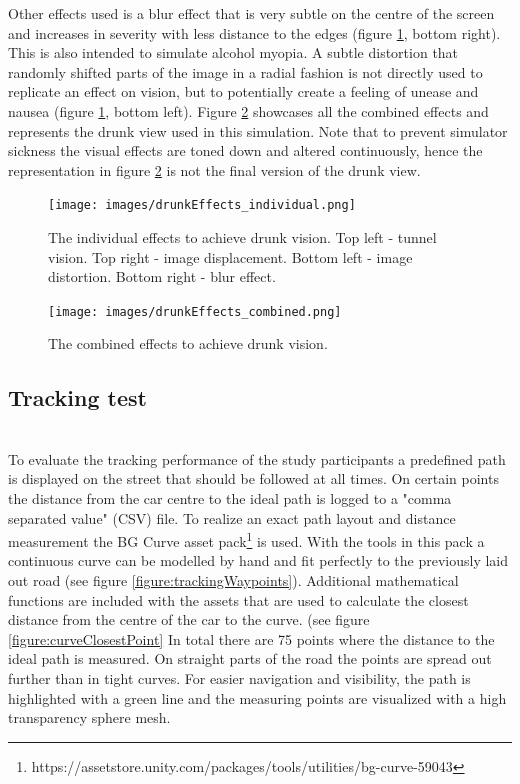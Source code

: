 Other effects used is a blur effect that is very subtle on the centre of the screen and increases in severity with less distance to the edges (figure \ref{figure:drunkEffectsIndividual}, bottom right).
This is also intended to simulate alcohol myopia.
A subtle distortion that randomly shifted parts of the image in a radial fashion is not directly used to replicate an effect on vision, but to potentially create a feeling of unease and nausea (figure \ref{figure:drunkEffectsIndividual}, bottom left).
Figure \ref{figure:drunkEffectsCombined} showcases all the combined effects and represents the drunk view used in this simulation.
Note that to prevent simulator sickness the visual effects are toned down and altered continuously, hence the representation in figure \ref{figure:drunkEffectsCombined} is not the final version of the drunk view. 

\begin{figure}[h]
    \centering
	\texttt{[image: images/drunkEffects\_individual.png]}
	\caption[
		Drunk effects individually
	]{
		The individual effects to achieve drunk vision. Top left - tunnel vision. Top right - image displacement. Bottom left - image distortion. Bottom right - blur effect. 
	}
	\label{figure:drunkEffectsIndividual}
\end{figure}

\begin{figure}[h]
    \centering
	\texttt{[image: images/drunkEffects\_combined.png]}
	\caption[
		Drunk effects combined
	]{
		The combined effects to achieve drunk vision.
	}
	\label{figure:drunkEffectsCombined}
\end{figure}

\subsection{Tracking test}
\label{subsection:tracking test}
\\
To evaluate the tracking performance of the study participants a predefined path is displayed on the street that should be followed at all times.
On certain points the distance from the car centre to the ideal path is logged to a "comma separated value" (CSV) file.
To realize an exact path layout and distance measurement the BG Curve asset pack\footnote{https://assetstore.unity.com/packages/tools/utilities/bg-curve-59043} is used.
With the tools in this pack a continuous curve can be modelled by hand and fit perfectly to the previously laid out road (see figure \ref{figure:trackingWaypoints}).
Additional mathematical functions are included with the assets that are used to calculate the closest distance from the centre of the car to the curve. (see figure \ref{figure:curveClosestPoint}
In total there are 75 points where the distance to the ideal path is measured.
On straight parts of the road the points are spread out further than in tight curves.
For easier navigation and visibility, the path is highlighted with a green line and the measuring points are visualized with a high transparency sphere mesh.

